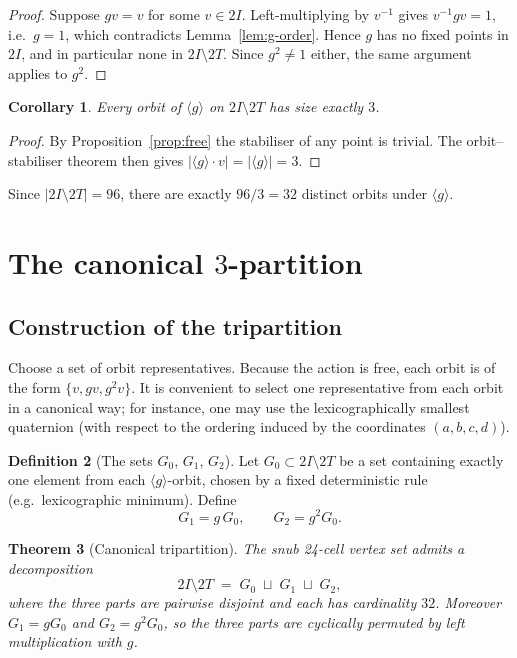 \documentclass[10pt,reqno]{amsart}
\theoremstyle{plain}
\newtheorem{theorem}{Theorem}[section]
\newtheorem{corollary}[theorem]{Corollary}
\theoremstyle{definition}
\newtheorem{definition}[theorem]{Definition}
\begin{document}
\begin{proof}
Suppose $g v = v$ for some $v \in 2I$. Left-multiplying by $v^{-1}$ gives $v^{-1} g v = 1$, i.e.\ $g=1$, which contradicts Lemma~\ref{lem:g-order}. Hence $g$ has no fixed points in $2I$, and in particular none in $2I \setminus 2T$. Since $g^2 \neq 1$ either, the same argument applies to $g^2$.
\end{proof}

\begin{corollary}
Every orbit of $\langle g \rangle$ on $2I \setminus 2T$ has size exactly $3$.
\end{corollary}

\begin{proof}
By Proposition~\ref{prop:free} the stabiliser of any point is trivial. The orbit--stabiliser theorem then gives $|\langle g \rangle \cdot v| = |\langle g \rangle| = 3$.
\end{proof}

Since $|2I \setminus 2T| = 96$, there are exactly $96/3 = 32$ distinct orbits under $\langle g \rangle$.

\section{The canonical $3$-partition}\label{sec:partition}

\subsection{Construction of the tripartition}

Choose a set of orbit representatives. Because the action is free, each orbit is of the form $\{v, gv, g^2 v\}$. It is convenient to select one representative from each orbit in a canonical way; for instance, one may use the lexicographically smallest quaternion (with respect to the ordering induced by the coordinates $(a,b,c,d)$).

\begin{definition}[The sets $G_0$, $G_1$, $G_2$]\label{def:partition}
Let $G_0 \subset 2I \setminus 2T$ be a set containing exactly one element from each $\langle g \rangle$-orbit, chosen by a fixed deterministic rule (e.g.\ lexicographic minimum). Define
\begin{equation}
G_1 = g\,G_0, \qquad G_2 = g^2 G_0.
\end{equation}
\end{definition}

\begin{theorem}[Canonical tripartition]\label{thm:main}
The snub 24-cell vertex set admits a decomposition
\begin{equation}\label{eq:main}
2I \setminus 2T \;=\; G_0 \;\sqcup\; G_1 \;\sqcup\; G_2,
\end{equation}
where the three parts are pairwise disjoint and each has cardinality $32$. Moreover $G_1 = g G_0$ and $G_2 = g^2 G_0$, so the three parts are cyclically permuted by left multiplication with $g$.
\end{theorem}
\end{document}
